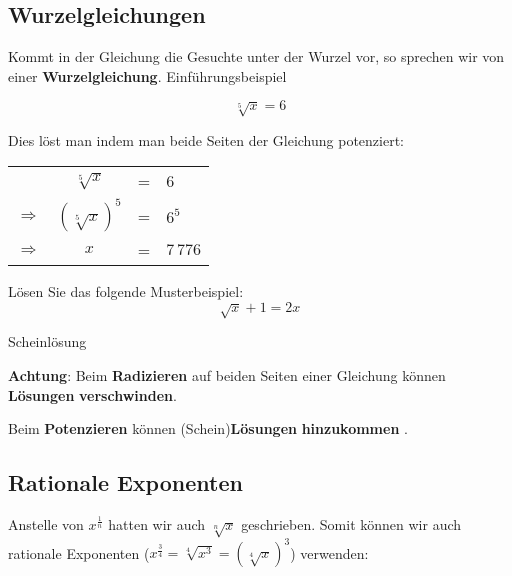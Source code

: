 \newpage
\subsection{Wurzelgleichungen}
Kommt in der Gleichung die Gesuchte unter der Wurzel vor, so sprechen
wir von einer \textbf{Wurzelgleichung}. Einführungsbeispiel


$$\sqrt[5]{x}=6$$


Dies löst man indem man beide Seiten der Gleichung potenziert:

\begin{tabular}{rccl}
  \             & $\sqrt[5]{x}$   &=&     6      \\
  $\Rightarrow$ & $(\sqrt[5]x)^5$ &=&  $6^5$     \\
  $\Rightarrow$ & $x$             &=& $7\,776$ 
\end{tabular}


Lösen Sie das folgende Musterbeispiel:
$$\sqrt{x}+1=2x$$



\begin{bemerkung}{Scheinlösung}{}
  
\textbf{Achtung}: Beim \textbf{Radizieren} auf beiden Seiten
einer Gleichung können \textbf{Lösungen} \textbf{verschwinden}.


Beim \textbf{Potenzieren} können (Schein)\textbf{Lösungen}
\textbf{hinzukommen} .
\end{bemerkung}
\newpage



\subsection{Rationale Exponenten}

Anstelle von $x^{\frac{1}{n}}$ hatten wir auch $\sqrt[n]{x}$
geschrieben.
Somit können wir auch rationale Exponenten ($x^{\frac{3}{4}}  = \sqrt[4]{x^{3}} = (\sqrt[4]x)^3$) verwenden:

